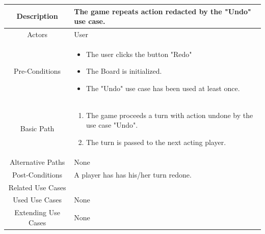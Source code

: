 \documentclass[10pt, a4paper]{article}
\begin{document}
			\begin{center}
				\begin{tabular}{ |c|p{10cm}| } 
					\hline
					Description & The game repeats action redacted by the "Undo" use case. \\
					\hline 
					Actors & User \\
					\hline  
					Pre-Conditions & \begin{itemize}[noitemsep,topsep=0pt]
						\item The user clicks the button "Redo"
						\item The Board is initialized.
						\item The "Undo" use case has been used at least once.
					\end{itemize} \\
					\hline  
					Basic Path & 
					\begin{enumerate}
						\item The game proceeds a turn with action undone by the use case "Undo".
						\item The turn is passed to the next acting player.
					\end{enumerate}\\
					\hline
					Alternative Paths & None \\
					\hline
					Post-Conditions & A player has has his/her turn redone.\\
					\hline 
					Related Use Cases & \\
					\hline 
					Used Use Cases & None\\
					\hline 
					Extending Use Cases & None \\
					\hline 
				\end{tabular}
			\end{center}
		
		\newpage
		
\end{document}
